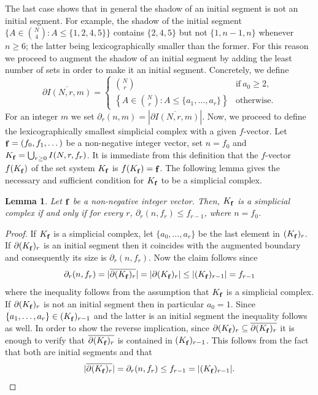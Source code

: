 \documentclass[11pt]{article}
\newtheorem{lemma}[theorem]{Lemma}
\numberwithin{claimcounter}{theorem}
\theoremstyle{remark}
\theoremstyle{definition}
\numberwithin{theorem}{section}
\DeclareMathOperator{\fvec}{\bf f}
\begin{document}
The last case shows that in general the shadow of an initial segment is not an initial segment.
For example, the shadow of the initial segment $\{A\in \binom{N}{4}\colon A \leq \{1,2,4,5\}\}$ contains $\{2,4,5\}$
but not $\{1,n-1,n\}$ whenever $n\geq 6$; the latter being lexicographically smaller than the former.
For this reason we proceed to augment the shadow of an initial segment by adding the least number of sets in order to make it an initial segment.
Concretely, we define
$$\overline{\partial I(N,r,m)} = 
\begin{cases} 
    \binom{N}{r} & \text{if}~a_0\geq 2, \\
    \left \{A \in \binom{N}{r} \colon A \leq \{a_1,\dots, a_r\} \right \} &  \text{otherwise.}
\end{cases}$$
For an integer $m$ we set $\partial_r(n,m) = |\overline{\partial I(N,r,m)}|$.
%
Now, we proceed to define the lexicographically smallest simplicial complex with a given $f$-vector.
Let $\fvec = (f_0,f_1,\dots)$ be a non-negative integer vector, set $n=f_0$ and $K_{\fvec} = \bigcup_{r\geq 0}I(N,r,f_r)$.
It is immediate from this definition that the $f$-vector $f(K_{\fvec})$ of the set system $K_{\fvec}$ is $f(K_{\fvec}) = \fvec$.
The following lemma gives the necessary and sufficient condition for $K_{\fvec}$ to be a simplicial complex.
\begin{lemma}
    Let $\fvec$ be a non-negative integer vector. Then, $K_{\fvec}$ is a simplicial complex if and only if for every $r$, $\partial_r(n,f_r) \leq f_{r-1}$, where $n=f_0$.    
  \end{lemma}
\begin{proof}
  If $K_{\fvec}$ is a simplicial complex, let $\{a_0,\dots, a_r\}$ be the last element in  $(K_{\fvec})_r$.   
  If $\partial (K_{\fvec})_r$ is an initial segment then it coincides with the augmented boundary and consequently its size is $\partial_r(n,f_r)$.
  Now the claim follows since $$\partial_r(n,f_r) = |\overline{\partial (K_{\fvec})_r}| = |\partial (K_{\fvec})_r|\leq |(K_{\fvec})_{r-1}| = f_{r-1}$$
  where the inequality follows from the assumption that $K_{\fvec}$ is a simplicial complex.
  If $\partial (K_{\fvec})_r$ is not an initial segment then in particular $a_0=1$. Since $\{a_1,\dots,a_r\} \in (K_{\fvec})_{r-1}$ and the latter is an initial segment the inequality follows as well.
%
    In order to show the reverse implication, since $\partial (K_{\fvec})_r \subseteq \overline{\partial (K_{\fvec})_r}$ it is enough to verify that $\overline{\partial (K_{\fvec})_r}$ is contained in $(K_{\fvec})_{r-1}$. This follows from the fact that both are initial segments and that $$|\overline{\partial (K_{\fvec})_r}| = \partial_r (n,f_r) \leq f_{r-1} = |(K_{\fvec})_{r-1}|.$$
  \end{proof}
\end{document}
